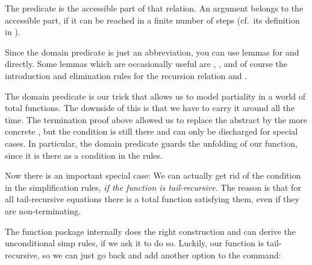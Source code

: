 \begin{isabellebody}
\begin{isamarkuptext}
  The predicate  is the accessible part of
  that relation. An argument belongs to the accessible part, if it can
  be reached in a finite number of steps (cf.~its definition in ).

  Since the domain predicate is just an abbreviation, you can use
  lemmas for  and  directly. Some
  lemmas which are occasionally useful are , , and of course the introduction and elimination rules
  for the recursion relation  and .%
\end{isamarkuptext}%
\isamarkuptrue%
%
\isamarkuptrue%
%
\begin{isamarkuptext}%
The domain predicate is our trick that allows us to model partiality
  in a world of total functions. The downside of this is that we have
  to carry it around all the time. The termination proof above allowed
  us to replace the abstract  by the more
  concrete , but the condition is still
  there and can only be discharged for special cases.
  In particular, the domain predicate guards the unfolding of our
  function, since it is there as a condition in the 
  rules. 

  Now there is an important special case: We can actually get rid
  of the condition in the simplification rules, \emph{if the function
  is tail-recursive}. The reason is that for all tail-recursive
  equations there is a total function satisfying them, even if they
  are non-terminating. 

%
%


  The function package internally does the right construction and can
  derive the unconditional simp rules, if we ask it to do so. Luckily,
  our  function is tail-recursive, so we can just go
  back and add another option to the  command:


\end{isamarkuptext}
\end{isabellebody}

